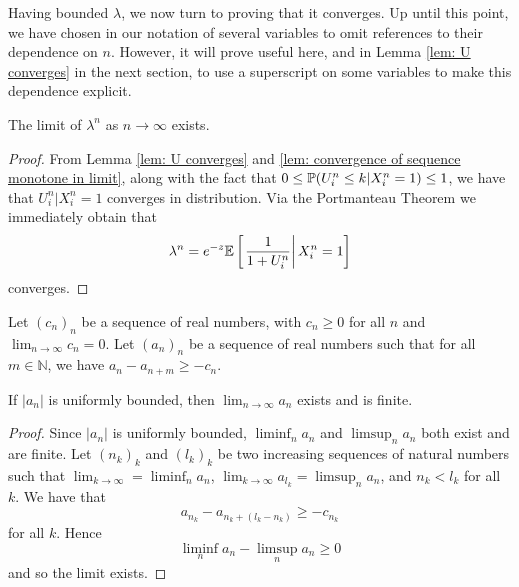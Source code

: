 	Having bounded $\lambda$, we now turn to proving that it converges.
	Up until this point, we have chosen in our notation of several variables to omit references to their dependence on $n$. However, it will prove useful here, and in Lemma \ref{lem: U converges} in the next section, to use a superscript on some variables to make this dependence explicit. 

	\begin{lemma}
		The limit of $\lambda^n$ as $n \rightarrow \infty$ exists.
	\end{lemma}
	\begin{proof}
		From Lemma \ref{lem: U converges} and \ref{lem: convergence of sequence monotone in limit}, along with the fact that $0 \leq \mathbb{P}(U_i^n \leq k | X_i^n = 1) \leq 1$, we have that $U_i^n | X_i^n = 1$ converges in distribution. Via the Portmanteau Theorem \cite[Theorem 25.8]{Billingsley1995-en} we immediately obtain that
		\begin{equation}
			\lambda^n = e^{-z} \mathbb{E} \left[\left.\frac{1}{1 + U_i^n}\right| X_i^n = 1\right]
		\end{equation}
		converges. 
	\end{proof}

	\begin{lemma}
	\label{lem: convergence of sequence monotone in limit}
		Let $(c_n)_n$ be a sequence of real numbers, with $c_n \geq 0$ for all $n$ and $\lim_{n\rightarrow \infty} c_n = 0$. Let $(a_n)_n$ be a sequence of real numbers such that for all $m \in \mathbb{N}$, we have $a_n - a_{n+m} \geq -c_n$. 

		If $|a_n|$ is uniformly bounded, then $\lim_{n\rightarrow \infty} a_n$ exists and is finite.
	\end{lemma}
	\begin{proof}
		Since $|a_n|$ is uniformly bounded, $\liminf_n a_n$ and $\limsup_n a_n$ both exist and are finite.
		Let $(n_k)_k$ and $(l_k)_k$ be two increasing sequences of natural numbers such that $\lim_{k \rightarrow \infty} = \liminf_n a_n$, $\lim_{k \rightarrow \infty} a_{l_k} = \limsup_n a_n$, and $n_k < l_k$ for all $k$. We have that 
		\begin{equation}
			a_{n_k} - a_{n_k + (l_k - n_k)} \geq -c_{n_k}
		\end{equation}
		for all $k$. Hence 
		\begin{equation}
			\liminf_n a_n - \limsup_n a_n \geq 0
		\end{equation}
		and so the limit exists.
	\end{proof}




